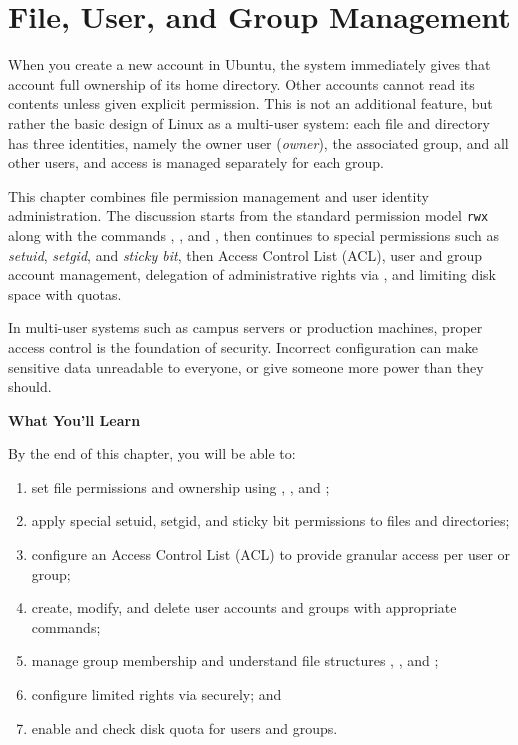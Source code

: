 
\chapter{File, User, and Group Management}
\label{ch:file-and-user-management}


When you create a new account in Ubuntu, the system immediately gives that account full ownership of its home directory. Other accounts cannot read its contents unless given explicit permission. This is not an additional feature, but rather the basic design of Linux as a multi-user system: each file and directory has three identities, namely the owner user (\textit{owner}), the associated group, and all other users, and access is managed separately for each group.

This chapter combines file permission management and user identity administration. The discussion starts from the standard permission model \texttt{rwx} along with the commands , , and , then continues to special permissions such as \textit{setuid}, \textit{setgid}, and \textit{sticky bit}, then Access Control List (ACL), user and group account management, delegation of administrative rights via , and limiting disk space with quotas.

In multi-user systems such as campus servers or production machines, proper access control is the foundation of security. Incorrect configuration can make sensitive data unreadable to everyone, or give someone more power than they should.

\textbf{What You'll Learn}

By the end of this chapter, you will be able to:

\begin{enumerate}
\item set file permissions and ownership using , , and ;
\item apply special setuid, setgid, and sticky bit permissions to files and directories;
\item configure an Access Control List (ACL) to provide granular access per user or group;
\item create, modify, and delete user accounts and groups with appropriate commands;
\item manage group membership and understand file structures , , and ;
\item configure limited  rights via  securely; and
\item enable and check disk quota for users and groups.
\end{enumerate}

